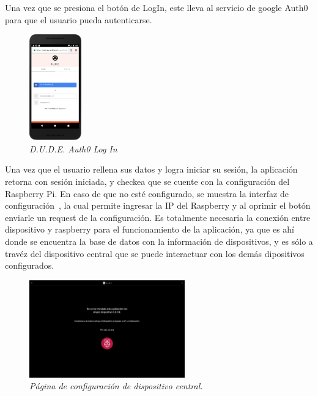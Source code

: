 Una vez que se presiona el botón de LogIn, este lleva al servicio de google Auth0 para que el usuario pueda autenticarse. ~


\begin{figure}[H]
  \centering
  \includegraphics[width=0.2\textwidth, keepaspectratio]{images/app-movil-auth0}
  \caption{\textit{D.U.D.E. Auth0 Log In}}
  \label{fig:app-movil-auth0}
\end{figure}

Una vez que el usuario rellena sus datos y logra iniciar su sesión, la aplicación retorna con sesión iniciada, y checkea que se cuente con la configuración del Raspberry Pi.
En caso de que no esté configurado, se muestra la interfaz de configuración~, la cual permite ingresar la IP del Raspberry y al oprimir el botón enviarle un request de la configuración. Es totalmente necesaria la conexión entre dispositivo y raspberry para el funcionamiento de la aplicación, ya que es ahí donde se encuentra la base de datos con la información de dispositivos, y es sólo a travéz del dispositivo central que se puede interactuar con los demás dipositivos configurados.

\begin{figure}[H]
  \centering
  \includegraphics[width=0.6\textwidth, keepaspectratio]{images/app-web-get-raspberry-configuration}
  \caption{\textit{Página de configuración de dispositivo central.}}
  \label{fig:app-web-get-raspberry-configuration}
\end{figure}

